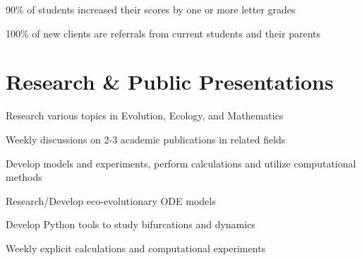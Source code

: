 \documentclass[letterpaper]{deedy-resume} %
\begin{document}
\begin{minipage}[t]{0.66\textwidth}
\sectionspace %



\begin{tightitemize}
\item 90\% of students increased their scores by one or more letter grades
\item 100\% of new clients are referrals from current students and their parents
\end{tightitemize}

\sectionspace %

\section{Research \& Public Presentations}


\begin{tightitemize}
\item Research various topics in Evolution, Ecology, and Mathematics
\item Weekly discussions on 2-3 academic publications in related fields
\item Develop models and experiments, perform calculations and utilize computational methods
\end{tightitemize}
\sectionspace


\begin{tightitemize}
\item Research/Develop eco-evolutionary ODE models
\item Develop Python tools to study bifurcations and dynamics
\item Weekly explicit calculations and computational experiments
\end{tightitemize}
\sectionspace %



\end{minipage}
\end{document}
